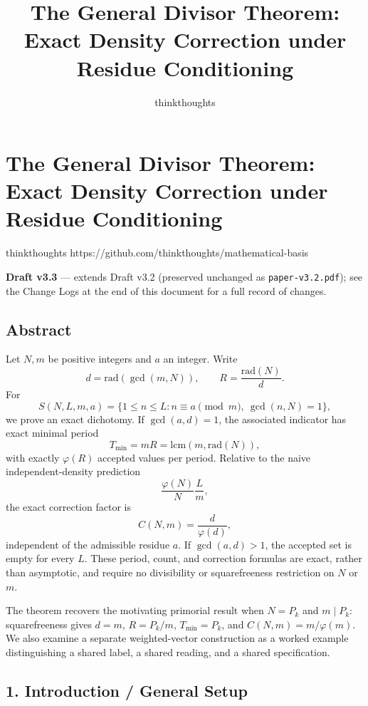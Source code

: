 \documentclass[
]{article}
\author{}
\date{}
\title{The General Divisor Theorem: Exact Density Correction under Residue Conditioning}
\author{thinkthoughts}
\date{}
\begin{document}
\maketitle

\section{The General Divisor Theorem: Exact Density Correction under
Residue
Conditioning}\label{the-general-divisor-theorem-exact-density-correction-under-residue-conditioning}

thinkthoughts https://github.com/thinkthoughts/mathematical-basis

\textbf{Draft v3.3} --- extends Draft v3.2 (preserved unchanged as
\texttt{paper-v3.2.pdf}); see the Change Logs at the end of this document
for a full record of changes.

\subsection{Abstract}\label{abstract}

Let \(N,m\) be positive integers and \(a\) an integer. Write \[
d=\mathrm{rad}(\gcd(m,N)),
\qquad
R=\frac{\mathrm{rad}(N)}{d}.
\] For \[
S(N,L,m,a)
=
\{1\le n\le L:n\equiv a\pmod m,\ \gcd(n,N)=1\},
\] we prove an exact dichotomy. If \(\gcd(a,d)=1\), the associated
indicator has exact minimal period \[
T_{\min}=mR=\mathrm{lcm}(m,\mathrm{rad}(N)),
\] with exactly \(\varphi(R)\) accepted values per period. Relative to
the naive independent-density prediction \[
\frac{\varphi(N)}{N}\frac{L}{m},
\] the exact correction factor is \[
C(N,m)=\frac{d}{\varphi(d)},
\] independent of the admissible residue \(a\). If \(\gcd(a,d)>1\), the
accepted set is empty for every \(L\). These period, count, and
correction formulas are exact, rather than asymptotic, and require no
divisibility or squarefreeness restriction on \(N\) or \(m\).

The theorem recovers the motivating primorial result when \(N=P_k\) and
\(m\mid P_k\): squarefreeness gives \(d=m\), \(R=P_k/m\),
\(T_{\min}=P_k\), and \(C(N,m)=m/\varphi(m)\). We also examine a
separate weighted-vector construction as a worked example distinguishing
a shared label, a shared reading, and a shared specification.

\subsection{1. Introduction / General
Setup}\label{introduction-general-setup}
\end{document}
